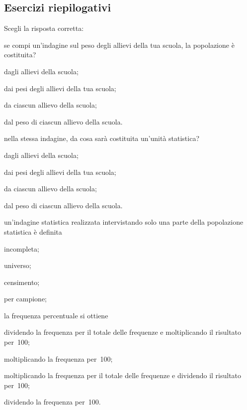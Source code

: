 \subsection{Esercizi riepilogativi}
\begin{esercizio}
\label{ese:A.39}
Scegli la risposta corretta:
\begin{enumerate*}
 \item se compi un'indagine sul peso degli allievi della tua scuola, la popolazione è costituita?
 \begin{enumeratea}
 \item dagli allievi della scuola;
\item dai pesi degli allievi della tua scuola;
\item da ciascun allievo della scuola;
\item dal peso di ciascun allievo della scuola.
 \end{enumeratea}
 \item nella stessa indagine, da cosa sarà costituita un'unità statistica?
 \begin{enumeratea}
 \item dagli allievi della scuola;
\item dai pesi degli allievi della tua scuola;
\item da ciascun allievo della scuola;
\item dal peso di ciascun allievo della scuola.
 \end{enumeratea}
\item un'indagine statistica realizzata intervistando solo una parte della popolazione statistica è definita
 \begin{enumeratea}
 \item incompleta;
\item universo;
\item censimento;
\item per campione;
 \end{enumeratea}
\item la frequenza percentuale si ottiene
 \begin{enumeratea}
\item dividendo la frequenza per il totale delle frequenze e moltiplicando il risultato per~100;
\item moltiplicando la frequenza per~100;
\item moltiplicando la frequenza per il totale delle frequenze e dividendo il risultato per~100;
\item dividendo la frequenza per~100.
 \end{enumeratea}

\end{enumerate*}
\end{esercizio}
